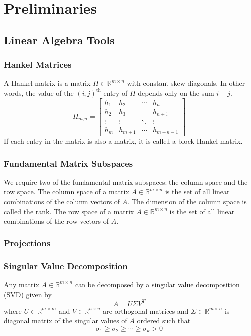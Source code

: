 \chapter{Preliminaries}

\section{Linear Algebra Tools}

\subsection*{Hankel Matrices}
A Hankel matrix is a matrix $H \in \mathbb{R}^{m\times n}$ with constant skew-diagonals. In other words, the value of the $(i, j)^{\mbox{th}}$ entry of $H$ depends only on the sum $i + j$.
\begin{equation*}
H_{m,n} = \begin{bmatrix}
h_1 & h_2 & \cdots & h_n\\
h_2 & h_3 & \cdots & h_{n+1}\\
\vdots & \vdots & \ddots & \vdots\\
h_m & h_{m+1} & \cdots & h_{m+n-1}
\end{bmatrix}
\end{equation*}
If each entry in the matrix is also a matrix, it is called a block Hankel matrix.


\subsection{Fundamental Matrix Subspaces}
We require two of the fundamental matrix subspaces: the column space and the row space. The column space of a matrix $A \in \mathbb{R}^{m\times n}$ is the set of all linear combinations of the column vectors of $A$. The dimension of the column space is called the rank. The row space of a matrix $A \in \mathbb{R}^{m\times n}$ is the set of all linear combinations of the row vectors of $A$.


\subsection{Projections}


\subsection{Singular Value Decomposition}
Any matrix $A \in \mathbb{R}^{m\times n}$ can be decomposed by a singular value decomposition (SVD) given by
\begin{equation*}
A = U\Sigma V^T
\end{equation*}
where $U \in \mathbb{R}^{m\times m}$ and $V \in \mathbb{R}^{n\times n}$ are orthogonal matrices and $\Sigma \in \mathbb{R}^{m\times n}$ is diagonal matrix of the singular values of $A$ ordered such that
\begin{equation*}
\sigma_1 \geq \sigma_2 \geq \cdots \geq \sigma_k > 0
\end{equation*}



